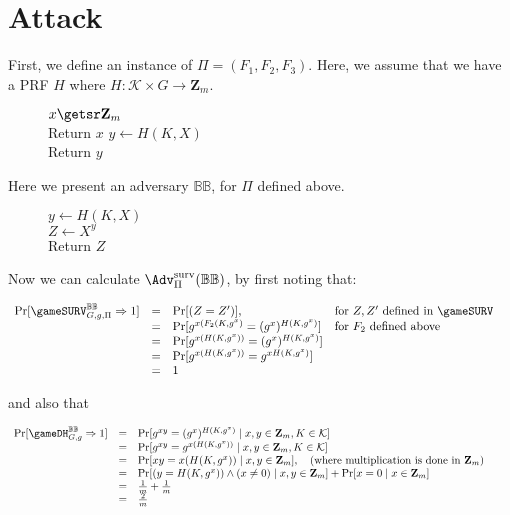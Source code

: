 \pagebreak
\section{Attack}\label{sec-attack}
First, we define an instance of $\Pi=(F_1,F_2,F_3)$. Here, we assume that we have a PRF $H$ where $H\colon \mathcal{K} \times G \rightarrow \mathbf{Z}_m$.

\begin{figure}[h]
{
$x\getsr\mathbf{Z}_m$\\
Return $x$
}
{
$y\gets H(K,X)$\\
Return $y$
}
\vspace{-1ex}
\label{fig-attack}
\end{figure}

Here we present an adversary $\mathbb{BB}$, for $\Pi$ defined above. 

\begin{figure}[h]
{
$y\gets H(K,X)$\\
$Z\gets X^y$\\
Return $Z$
}
\vspace{-1ex}
\label{fig-attack}
\end{figure}

Now we can calculate $\Adv^{\text{surv}}_\Pi(\mathbb{BB})$, by first noting that: 

\begin{math}
\begin{array}{lllllllll}
\Pr[\gameSURV_{G,g,\Pi}^{\mathbb{BB}}\Rightarrow 1] &=&\Pr[(Z=Z')], &\text{for $Z,Z'$ defined in $\gameSURV$}&\\
&=&\Pr[g^{x(F_2(K,g^x)}=(g^x)^{H(K,g^x)}]&\text{for $F_2$ defined above}&\\
&=&\Pr[g^{x(H(K,g^x))}=(g^x)^{H(K,g^x)}]&\\
&=&\Pr[g^{x(H(K,g^x))}=g^{xH(K,g^x)}]&\\
&=&1
\end{array}
\end{math} 

and also that 

\begin{math}
\begin{array}{lllllllll}
\Pr[\gameDH_{G,g}^{\mathbb{BB}}\Rightarrow 1] &=&\Pr[g^{xy}=(g^x)^{H(K,g^x)}\mid x,y \in \mathbf{Z}_m, K\in\mathcal{K}]&\\
&=&\Pr[g^{xy}=g^{x(H(K,g^x))}\mid x,y \in \mathbf{Z}_m, K\in\mathcal{K}]&\\
&=&\Pr[xy=x(H(K,g^x))\mid x,y \in \mathbf{Z}_m],\quad\text{(where multiplication is done in $\mathbf{Z}_m$)}&\\
&=&\Pr[(y=H(K,g^x))\land (x\neq 0)\mid x,y \in \mathbf{Z}_m]+\Pr[x=0\mid x \in \mathbf{Z}_m]&&\\
&=&\frac{1}{m}+\frac{1}{m}&&\\
&=&\frac{2}{m}&&\\

\end{array}
\end{math} 

